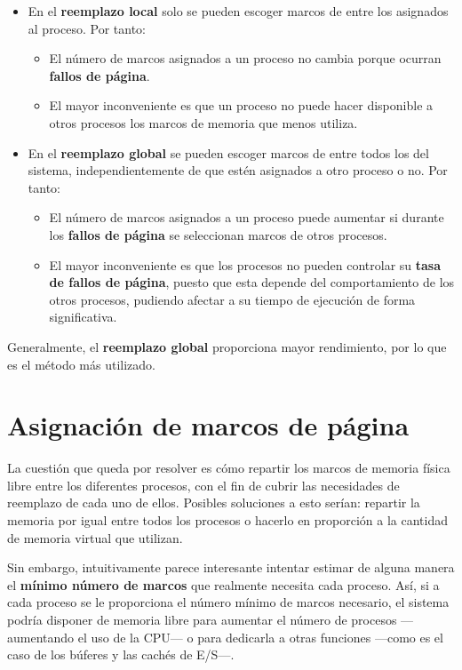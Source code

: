 \begin{itemize}
\item
  En el \textbf{reemplazo local}{} solo se pueden escoger marcos de
  entre los asignados al proceso. Por tanto:

  \begin{itemize}
  \item
    El número de marcos asignados a un proceso no cambia porque ocurran
    \textbf{fallos de página}.
  \item
    El mayor inconveniente es que un proceso no puede hacer disponible a
    otros procesos los marcos de memoria que menos utiliza.
  \end{itemize}
\item
  En el \textbf{reemplazo global}{} se pueden escoger marcos de entre
  todos los del sistema, independientemente de que estén asignados a
  otro proceso o no. Por tanto:

  \begin{itemize}
  \item
    El número de marcos asignados a un proceso puede aumentar si durante
    los \textbf{fallos de página} se seleccionan marcos de otros
    procesos.
  \item
    El mayor inconveniente es que los procesos no pueden controlar su
    \textbf{tasa de fallos de página}, puesto que esta depende del
    comportamiento de los otros procesos, pudiendo afectar a su tiempo
    de ejecución de forma significativa.
  \end{itemize}
\end{itemize}

Generalmente, el \textbf{reemplazo global} proporciona mayor
rendimiento, por lo que es el método más utilizado.

\section{Asignación de marcos de
página}\label{_asignaciuxf3n_de_marcos_de_puxe1gina}

{} La cuestión que queda por resolver es cómo repartir los marcos de
memoria física libre entre los diferentes procesos, con el fin de cubrir
las necesidades de reemplazo de cada uno de ellos. Posibles soluciones a
esto serían: repartir la memoria por igual entre todos los procesos o
hacerlo en proporción a la cantidad de memoria virtual que utilizan.

Sin embargo, intuitivamente parece interesante intentar estimar de
alguna manera el \textbf{mínimo número de marcos} que realmente necesita
cada proceso. Así, si a cada proceso se le proporciona el número mínimo
de marcos necesario, el sistema podría disponer de memoria libre para
aumentar el número de procesos ---aumentando el uso de la CPU--- o para
dedicarla a otras funciones ---como es el caso de los búferes y las
cachés de E/S---.

